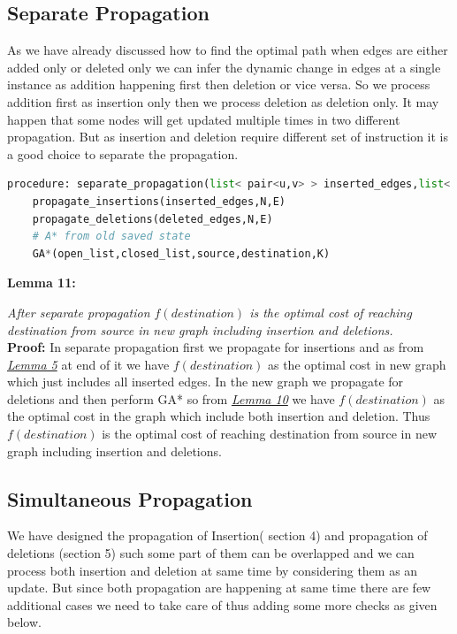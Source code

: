 \documentclass[a4paper]{article}
\begin{document}
\subsection{Separate Propagation }
As we have already discussed how to find the optimal path when edges are either added only or deleted only we can infer the dynamic change in edges at a single instance as addition happening first then deletion or vice versa. So we process addition first as insertion only then we process deletion as deletion only. It may happen that some nodes will get updated multiple times in two different propagation. But as insertion and deletion require different set of instruction it is a good choice to separate the propagation.
\begin{lstlisting}[language=python, caption=Manage Deletions]
procedure: separate_propagation(list< pair<u,v> > inserted_edges,list< pair<u,v> > deleted_edges,N,E)
    propagate_insertions(inserted_edges,N,E)
    propagate_deletions(deleted_edges,N,E)
    # A* from old saved state
    GA*(open_list,closed_list,source,destination,K)
\end{lstlisting}
\hypertarget{Lemma 11}{\textbf{Lemma 11:}} \textit{After separate propagation $f(destination)$ is the optimal cost of reaching destination from source in new graph including insertion and deletions.}\\
\textbf{Proof:} In separate propagation first we propagate for insertions and as from \hyperlink{Lemma 5}{\textit{Lemma 5}} at end of it we have $f(destination)$ as the optimal cost in new graph which just includes all inserted edges.
In the new graph we propagate for deletions and then perform GA* so from \hyperlink{Lemma 10}{\textit{Lemma 10}} we have $f(destination)$ as the optimal cost in the graph which include both insertion and deletion. Thus $f(destination)$ is the optimal cost of reaching destination from source in new graph including insertion and deletions.

\subsection{Simultaneous Propagation}
We have designed the propagation of Insertion( section 4) and propagation of deletions (section 5) such some part of them can be overlapped and we can process both insertion and deletion at same time by considering them as an update. But since both propagation are happening at same time there are few additional cases we need to take care of thus adding some more checks as given below.
\end{document}
